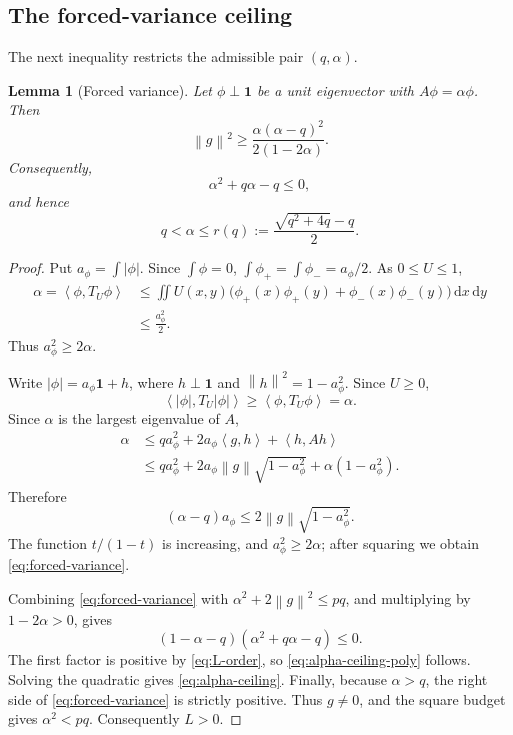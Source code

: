 \documentclass[11pt]{article}
\newtheorem{lemma}[theorem]{Lemma}
\newcommand{\one}{\mathbf 1}
\newcommand{\ip}[2]{\left\langle #1,#2\right\rangle}
\newcommand{\norm}[1]{\left\lVert #1\right\rVert}
\newcommand{\dd}{\,\mathrm d}
\begin{document}
\subsection{The forced-variance ceiling}\label{subsec:forced-variance}

The next inequality restricts the admissible pair \((q,\alpha)\).

\begin{lemma}[Forced variance]\label{lem:forced-variance}
Let \(\phi\perp\one\) be a unit eigenvector with \(A\phi=\alpha\phi\).  Then
\begin{equation}\label{eq:forced-variance}
       \norm g^2\ge
       \frac{\alpha(\alpha-q)^2}{2(1-2\alpha)}.
\end{equation}
Consequently,
\begin{equation}\label{eq:alpha-ceiling-poly}
       \alpha^2+q\alpha-q\le0,
\end{equation}
and hence
\begin{equation}\label{eq:alpha-ceiling}
       q<\alpha\le r(q):=
       \frac{\sqrt{q^2+4q}-q}{2}.
\end{equation}
\end{lemma}

\begin{proof}
Put \(a_\phi=\int|\phi|\).  Since \(\int\phi=0\),
\(\int\phi_+=\int\phi_-=a_\phi/2\).  As \(0\le U\le1\),
\[
\begin{aligned}
 \alpha=\ip\phi{T_U\phi}
 &\le\iint U(x,y)
       \bigl(\phi_+(x)\phi_+(y)+\phi_-(x)\phi_-(y)\bigr)\dd x\dd y\\
 &\le\frac{a_\phi^2}{2}.
\end{aligned}
\]
Thus \(a_\phi^2\ge2\alpha\).

Write \(|\phi|=a_\phi\one+h\), where \(h\perp\one\) and
\(\norm h^2=1-a_\phi^2\).  Since \(U\ge0\),
\[
       \ip{|\phi|}{T_U|\phi|}\ge\ip\phi{T_U\phi}=\alpha.
\]
Since \(\alpha\) is the largest eigenvalue of \(A\),
\[
\begin{aligned}
 \alpha
 &\le qa_\phi^2+2a_\phi\ip g h+\ip h{Ah}\\
 &\le qa_\phi^2+2a_\phi\norm g\sqrt{1-a_\phi^2}
       +\alpha(1-a_\phi^2).
\end{aligned}
\]
Therefore
\[
       (\alpha-q)a_\phi
       \le2\norm g\sqrt{1-a_\phi^2}.
\]
The function \(t/(1-t)\) is increasing, and
\(a_\phi^2\ge2\alpha\); after squaring we obtain
\eqref{eq:forced-variance}.

Combining \eqref{eq:forced-variance} with
\(\alpha^2+2\norm g^2\le pq\), and multiplying by
\(1-2\alpha>0\), gives
\[
       (1-\alpha-q)(\alpha^2+q\alpha-q)\le0.
\]
The first factor is positive by \eqref{eq:L-order}, so
\eqref{eq:alpha-ceiling-poly} follows.  Solving the quadratic gives
\eqref{eq:alpha-ceiling}.  Finally, because \(\alpha>q\), the right side of
\eqref{eq:forced-variance} is strictly positive.  Thus \(g\ne0\), and the
square budget gives \(\alpha^2<pq\).  Consequently \(L>0\).
\end{proof}
\end{document}
